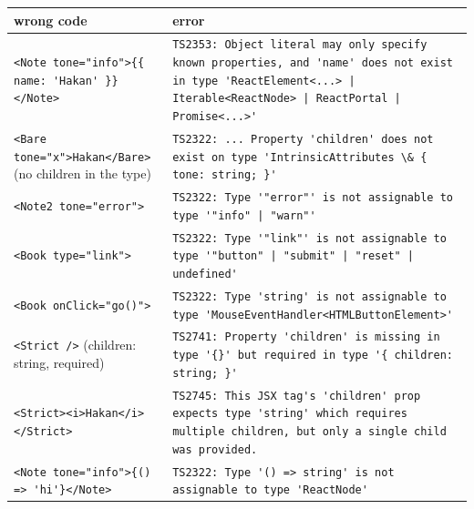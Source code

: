 {\def\LTcaptype{none} %
\begin{longtable}[]{@{}
  >{\raggedright\arraybackslash}p{}
  >{\raggedright\arraybackslash}p{}@{}}
\toprule\noalign{}
\begin{minipage}[b]{\linewidth}\raggedright
wrong code
\end{minipage} & \begin{minipage}[b]{\linewidth}\raggedright
error
\end{minipage} \\
\midrule\noalign{}
\endhead
\bottomrule\noalign{}
\endlastfoot
\passthrough{\lstinline!<Note tone="info">\{\{ name: 'Hakan' \}\}</Note>!} & \passthrough{\lstinline!TS2353: Object literal may only specify known properties, and 'name' does not exist in type 'ReactElement<...> | Iterable<ReactNode> | ReactPortal | Promise<...>'!} \\
\passthrough{\lstinline!<Bare tone="x">Hakan</Bare>!} (no children in the type) & \passthrough{\lstinline!TS2322: ... Property 'children' does not exist on type 'IntrinsicAttributes \& \{ tone: string; \}'!} \\
\passthrough{\lstinline!<Note2 tone="error">!} & \passthrough{\lstinline!TS2322: Type '"error"' is not assignable to type '"info" | "warn"'!} \\
\passthrough{\lstinline!<Book type="link">!} & \passthrough{\lstinline!TS2322: Type '"link"' is not assignable to type '"button" | "submit" | "reset" | undefined'!} \\
\passthrough{\lstinline!<Book onClick="go()">!} & \passthrough{\lstinline!TS2322: Type 'string' is not assignable to type 'MouseEventHandler<HTMLButtonElement>'!} \\
\passthrough{\lstinline!<Strict />!} (children: string, required) & \passthrough{\lstinline!TS2741: Property 'children' is missing in type '\{\}' but required in type '\{ children: string; \}'!} \\
\passthrough{\lstinline!<Strict><i>Hakan</i></Strict>!} & \passthrough{\lstinline!TS2745: This JSX tag's 'children' prop expects type 'string' which requires multiple children, but only a single child was provided.!} \\
\passthrough{\lstinline!<Note tone="info">\{() => 'hi'\}</Note>!} & \passthrough{\lstinline!TS2322: Type '() => string' is not assignable to type 'ReactNode'!} \\
\end{longtable}
}

